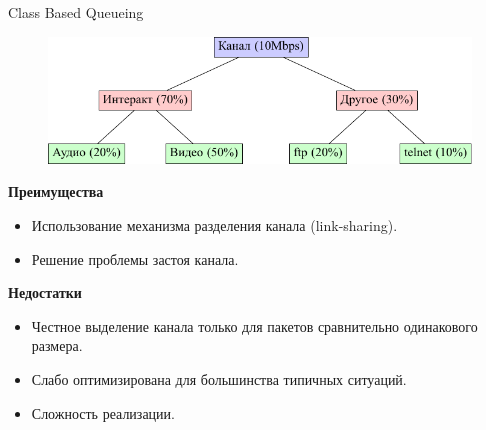 \documentclass[12pt]{beamer}
\begin{document}
\begin{frame}{Class Based Queueing}
	\begin{figure}
		\center
    	\includegraphics[scale=0.6]{../text/src/pdfimages/cbq.pdf}
	\end{figure}


	\begin{center}
        {\scriptsize
            \begin{multicols}{2}
				{\bf Преимущества}
				\begin{itemize}
					\item Использование механизма разделения канала (link-sharing).						  
					\item Решение проблемы застоя канала.
				\end{itemize}
            \columnbreak
				{\bf Недостатки}
				\begin{itemize}
					\item Честное выделение канала только для пакетов сравнительно одинакового размера.
					\item Слабо оптимизирована для большинства типичных ситуаций.
					\item Сложность реализации.
				\end{itemize}
            \end{multicols}
        }
	\end{center}
\end{frame}
\end{document}
